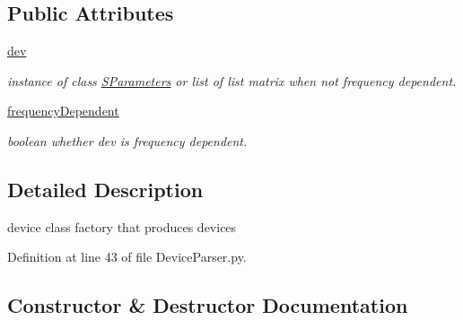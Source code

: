 \subsection*{Public Attributes}
\begin{DoxyCompactItemize}
\item 
\mbox{\label{classSignalIntegrity_1_1Parsers_1_1Devices_1_1DeviceParser_1_1DeviceFactory_ac43812121e594f158520698ba706118f}} 
\hyperlink{classSignalIntegrity_1_1Parsers_1_1Devices_1_1DeviceParser_1_1DeviceFactory_ac43812121e594f158520698ba706118f}{dev}
\begin{DoxyCompactList}\small\item\em instance of class \hyperlink{namespaceSignalIntegrity_1_1SParameters}{S\+Parameters} or list of list matrix when not frequency dependent. \end{DoxyCompactList}\item 
\hyperlink{classSignalIntegrity_1_1Parsers_1_1Devices_1_1DeviceParser_1_1DeviceFactory_a3909d31bcdbe6e7a3450d1fa216755a2}{frequency\+Dependent}
\begin{DoxyCompactList}\small\item\em boolean whether dev is frequency dependent. \end{DoxyCompactList}\end{DoxyCompactItemize}


\subsection{Detailed Description}
device class factory that produces devices 

Definition at line 43 of file Device\+Parser.\+py.



\subsection{Constructor \& Destructor Documentation}
\mbox{\label{classSignalIntegrity_1_1Parsers_1_1Devices_1_1DeviceParser_1_1DeviceFactory_ae64f0875afe3067b97ba370b354b9213}} 
